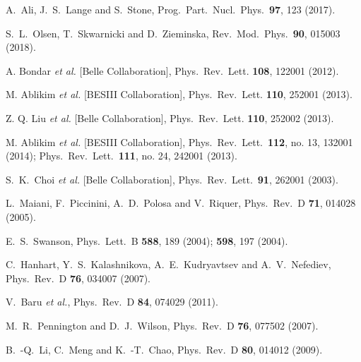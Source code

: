 \documentclass[twocolumn,showpacs,superscriptaddress,preprintnumbers,nofootinbib,prd]{revtex4-1}
\begin{document}
\begin{thebibliography}{}
  A.~Ali, J.~S.~Lange and S.~Stone,
  Prog.\ Part.\ Nucl.\ Phys.\  {\bf 97}, 123 (2017).

  S.~L.~Olsen, T.~Skwarnicki and D.~Zieminska,
  Rev.\ Mod.\ Phys.\  {\bf 90}, 015003 (2018).

  A. Bondar {\it et al.} [Belle Collaboration],
  Phys.\ Rev.\ Lett. {\bf 108}, 122001 (2012).

  M. Ablikim {\it et al.} [BESIII Collaboration],
  Phys.\ Rev.\ Lett. {\bf 110}, 252001 (2013).

  Z. Q. Liu {\it et al.} [Belle Collaboration],
  Phys.\ Rev.\ Lett. {\bf 110}, 252002 (2013).

  M. Ablikim {\it et al.} [BESIII Collaboration],
  Phys.\ Rev.\ Lett.\  {\bf 112}, no. 13, 132001 (2014);
  Phys.\ Rev.\ Lett.\  {\bf 111}, no. 24, 242001 (2013).

  S.~K.~Choi {\it et al.} [Belle Collaboration],
  Phys.\ Rev.\ Lett.\  {\bf 91}, 262001 (2003).
	
  L.~Maiani, F.~Piccinini, A.~D.~Polosa and V.~Riquer,
  Phys.\ Rev.\ D {\bf 71}, 014028 (2005).			
		
  E.~S.~Swanson,
  Phys.\ Lett.\ B {\bf 588}, 189 (2004);
  {\bf 598}, 197 (2004).

  C.~Hanhart, Y.~S.~Kalashnikova, A.~E.~Kudryavtsev and A.~V.~Nefediev,
  Phys.\ Rev.\ D {\bf 76}, 034007 (2007).

  V.~Baru {\it et al.},
  Phys.\ Rev.\ D {\bf 84}, 074029 (2011).
 		
  M.~R.~Pennington and D.~J.~Wilson,
  Phys.\ Rev.\ D {\bf 76}, 077502 (2007).

  B.~-Q.~Li, C.~Meng and K.~-T.~Chao,
  Phys.\ Rev.\ D {\bf 80}, 014012 (2009).


\end{thebibliography}
\end{document}
